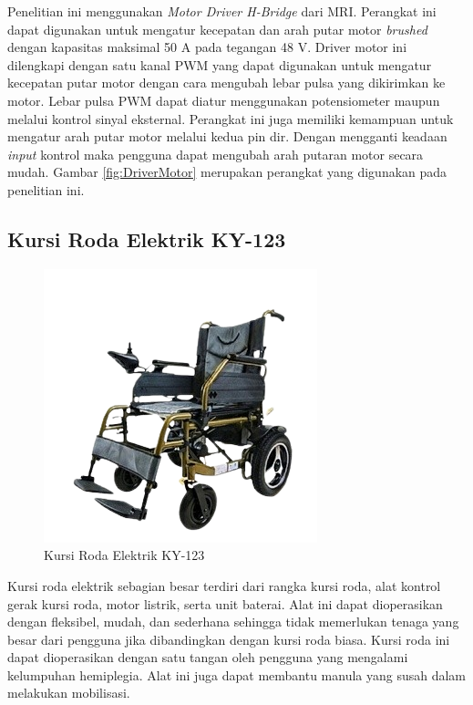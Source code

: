 Penelitian ini menggunakan \emph{Motor Driver H-Bridge} dari MRI. Perangkat ini dapat digunakan untuk mengatur kecepatan dan arah putar motor \emph{brushed} dengan kapasitas maksimal 50 A pada tegangan 48 V. Driver motor ini dilengkapi dengan satu kanal PWM yang dapat digunakan untuk mengatur kecepatan putar motor dengan cara mengubah lebar pulsa yang dikirimkan ke motor. Lebar pulsa PWM dapat diatur menggunakan potensiometer maupun melalui kontrol sinyal eksternal. Perangkat ini juga memiliki kemampuan untuk mengatur arah putar motor melalui kedua pin dir. Dengan mengganti keadaan \emph{input} kontrol maka pengguna dapat mengubah arah putaran motor secara mudah. Gambar \ref{fig:DriverMotor} merupakan perangkat yang digunakan pada penelitian ini.

\subsection{Kursi Roda Elektrik KY-123}

\begin{figure} [ht]
    \centering
        \includegraphics[scale=0.72]{gambar/WheelchairMySellaKY123.png}
        \caption{Kursi Roda Elektrik KY-123}
        \label{fig:KY123}
\end{figure}

Kursi roda elektrik sebagian besar terdiri dari rangka kursi roda, alat kontrol gerak kursi roda, motor listrik, serta unit baterai. Alat ini dapat dioperasikan dengan fleksibel, mudah, dan sederhana sehingga tidak memerlukan tenaga yang besar dari pengguna jika dibandingkan dengan kursi roda biasa. Kursi roda ini dapat dioperasikan dengan satu tangan oleh pengguna yang mengalami kelumpuhan hemiplegia. Alat ini juga dapat membantu manula yang susah dalam melakukan mobilisasi. 

